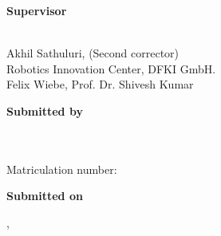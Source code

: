 {\begin{textblock*}{1\textwidth}
	
	\ifthenelse{\equal{\themenstellerlehrstuhl}{\betreutvonlehrstuhl}}
	{%
		\ifthenelse{\equal{\themensteller}{\betreutvonperson}}{}
		{%
	\vspace*{2mm}
	\textbf{Supervisor}\tab\hspace{-3cm}
	\begin{minipage}[t]{\textwidth-\CurrentLineWidth}
		\betreutvonlehrstuhl\\
		Akhil Sathuluri, \betreutvonzweitkorrektor{} (Second corrector)\\
		Robotics Innovation Center, DFKI GmbH. \\
		Felix Wiebe, Prof. Dr. Shivesh Kumar
	\end{minipage}
	}}{}
	
	\vspace*{2mm}
	\textbf{Submitted by}\tab\hspace{-3cm}
	\begin{minipage}[t]{\textwidth-\CurrentLineWidth}
		\derauthor\\
		\adresse\\
		Matriculation number: \matrikelnr\\
		\emailadresse\strut
	\end{minipage}
	
	\vspace*{2mm}
	\textbf{Submitted on}\tab\hspace{-3cm}
	\begin{minipage}[t]{\textwidth-\CurrentLineWidth}
		\eingereichtamort, \eingereichtamdatum\strut
	\end{minipage}
\end{textblock*}

}

\cleardoubleemptypage
